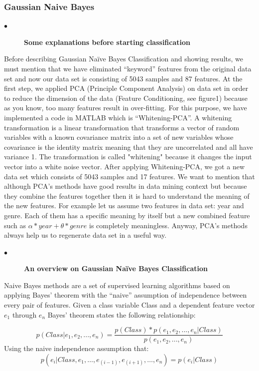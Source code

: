 \documentclass[journal,transmag]{IEEEtran}
\begin{document}
			\subsubsection{Gaussian Naive Bayes}
			\begin{description}
          \item[$\bullet$] \bf{Some explanations before starting classification}
            \end{description}	
Before describing Gaussian Naïve Bayes Classification and showing results, we must mention that we have eliminated “keyword” features from the original data set and now our data set is consisting of 5043 samples and 87 features. At the first step, we applied PCA (Principle Component Analysis) on data set in order to reduce the dimension of the data (Feature Conditioning, see figure1) because as you know, too many features result in over-fitting. For this purpose, we have implemented a code in MATLAB which is “Whitening-PCA”. A whitening transformation is a linear transformation that transforms a vector of random variables with a known covariance matrix into a set of new variables whose covariance is the identity matrix meaning that they are uncorrelated and all have variance 1\cite{refFoj}. The transformation is called "whitening" because it changes the input vector into a white noise vector. After applying Whitening-PCA, we got a new data set which consists of 5043 samples and 17 features. We want to mention that although PCA’s methods have good results in data mining context but because they combine the features together then it is hard to understand the meaning of the new features. For example let us assume two features in data set: year and genre. 
Each of them has a specific meaning by itself but a new combined feature such as $\alpha*year+\theta*genre$ is completely meaningless. Anyway, PCA’s methods always help us to regenerate data set in a useful way. 
	
			\begin{description}
          \item[$\bullet$] \bf{An overview on Gaussian Naïve Bayes Classification}
            \end{description}
Naive Bayes methods are a set of supervised learning algorithms based on applying Bayes’ theorem with the “naive” assumption of independence between every pair of features. Given a class variable Class and a dependent feature vector $e_1$ through $e_n$ Bayes’ theorem states the following relationship:

\begin{equation} \label{eq1}
p(Class | e_1,e_2,...,e_n)  = \frac{p(Class)*p(e_1,e_2,...,e_n|Class)}{p(e_1,e_2,...,e_n)} 
\end{equation}
Using the naive independence assumption that:
\begin{equation} \label{eq2}
p(e_i | Class,e_1,…,e_{(i-1)},e_{(i+1)},…,e_n )  = p(e_i | Class)
\end{equation}
\end{document}

